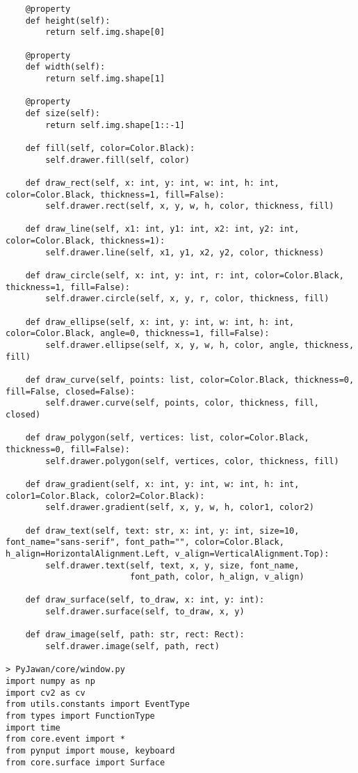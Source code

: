 \documentclass[11pt]{article}
\begin{document}
\begin{lstlisting}
    @property
    def height(self):
        return self.img.shape[0]

    @property
    def width(self):
        return self.img.shape[1]

    @property
    def size(self):
        return self.img.shape[1::-1]

    def fill(self, color=Color.Black):
        self.drawer.fill(self, color)

    def draw_rect(self, x: int, y: int, w: int, h: int, color=Color.Black, thickness=1, fill=False):
        self.drawer.rect(self, x, y, w, h, color, thickness, fill)

    def draw_line(self, x1: int, y1: int, x2: int, y2: int, color=Color.Black, thickness=1):
        self.drawer.line(self, x1, y1, x2, y2, color, thickness)

    def draw_circle(self, x: int, y: int, r: int, color=Color.Black, thickness=1, fill=False):
        self.drawer.circle(self, x, y, r, color, thickness, fill)

    def draw_ellipse(self, x: int, y: int, w: int, h: int, color=Color.Black, angle=0, thickness=1, fill=False):
        self.drawer.ellipse(self, x, y, w, h, color, angle, thickness, fill)

    def draw_curve(self, points: list, color=Color.Black, thickness=0, fill=False, closed=False):
        self.drawer.curve(self, points, color, thickness, fill, closed)

    def draw_polygon(self, vertices: list, color=Color.Black, thickness=0, fill=False):
        self.drawer.polygon(self, vertices, color, thickness, fill)

    def draw_gradient(self, x: int, y: int, w: int, h: int, color1=Color.Black, color2=Color.Black):
        self.drawer.gradient(self, x, y, w, h, color1, color2)

    def draw_text(self, text: str, x: int, y: int, size=10, font_name="sans-serif", font_path="", color=Color.Black, h_align=HorizontalAlignment.Left, v_align=VerticalAlignment.Top):
        self.drawer.text(self, text, x, y, size, font_name,
                         font_path, color, h_align, v_align)

    def draw_surface(self, to_draw, x: int, y: int):
        self.drawer.surface(self, to_draw, x, y)

    def draw_image(self, path: str, rect: Rect):
        self.drawer.image(self, path, rect)

> PyJawan/core/window.py
import numpy as np
import cv2 as cv
from utils.constants import EventType
from types import FunctionType
import time
from core.event import *
from pynput import mouse, keyboard
from core.surface import Surface



\end{lstlisting}
\end{document}

